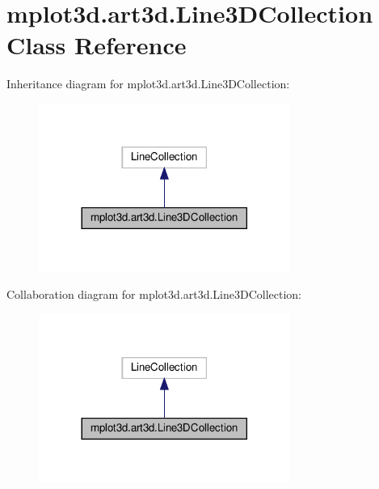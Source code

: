 \hypertarget{classmplot3d_1_1art3d_1_1Line3DCollection}{}\section{mplot3d.\+art3d.\+Line3\+D\+Collection Class Reference}
\label{classmplot3d_1_1art3d_1_1Line3DCollection}


Inheritance diagram for mplot3d.\+art3d.\+Line3\+D\+Collection\+:
\nopagebreak
\begin{figure}[H]
\begin{center}
\leavevmode
\includegraphics[width=233pt]{classmplot3d_1_1art3d_1_1Line3DCollection__inherit__graph}
\end{center}
\end{figure}


Collaboration diagram for mplot3d.\+art3d.\+Line3\+D\+Collection\+:
\nopagebreak
\begin{figure}[H]
\begin{center}
\leavevmode
\includegraphics[width=233pt]{classmplot3d_1_1art3d_1_1Line3DCollection__coll__graph}
\end{center}
\end{figure}
